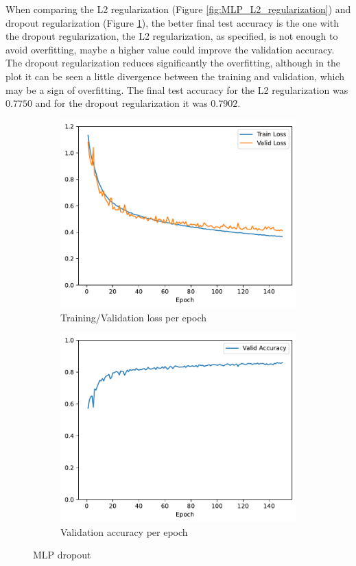 \documentclass[11pt]{article}
\begin{document}
When comparing the L2 regularization (Figure \ref{fig:MLP_L2_regularization}) and dropout regularization (Figure \ref{fig:MLP_dropout}), the better final test accuracy is the one with the dropout regularization, the L2 regularization, as specified, is not enough to avoid overfitting, maybe a higher value could improve the validation accuracy. The dropout regularization reduces significantly the overfitting, although in the plot it can be seen a little divergence between the training and validation, which may be a sign of overfitting.
The final test accuracy for the L2 regularization was $0.7750$ and for the dropout regularization it was $0.7902$.

\begin{figure}[h!]
\centering
\begin{subfigure}{.5\textwidth}
  \centering
  \includegraphics[width=.9\linewidth]{plots/mlp-training-loss-batch-256-lr-0.1-epochs-150-hidden-200-dropout-0.2-l2-0.0-layers-2-act-relu-opt-sgd.pdf}
  \caption{Training/Validation loss per epoch}
\end{subfigure}%
\begin{subfigure}{.5\textwidth}
  \centering
  \includegraphics[width=.9\linewidth]{plots/mlp-validation-accuracy-batch-256-lr-0.1-epochs-150-hidden-200-dropout-0.2-l2-0.0-layers-2-act-relu-opt-sgd}
  \caption{Validation accuracy per epoch}
\end{subfigure}
\caption{MLP dropout}
\label{fig:MLP_dropout}
\end{figure}
\end{document}
